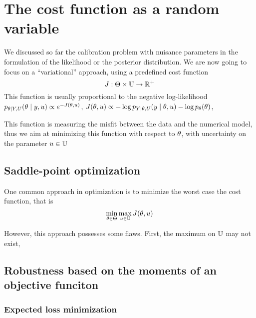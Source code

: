 \documentclass[../../Main_ManuscritThese.tex]{subfiles}
\begin{document}
\section{The cost function as a random variable}
\label{sec:J_rv}
We discussed so far the calibration problem with nuisance parameters in the formulation of the likelihood or the posterior distribution. We are now going to focus on a ``variational'' approach, using a predefined cost function
\begin{equation}
  J: \Theta \times \mathbb{U} \rightarrow \mathbb{R}^+
\end{equation} 
This function is usually proportional to the negative log-likelihood $p_{\theta \mid Y,U}(\theta\mid y,u) \propto e^{-J(\theta,u)}$,  $J(\theta,u) \propto -\log p_{Y \mid \theta,U}(y \mid \theta,u)- \log p_{\theta}(\theta)$,

This function is measuring the misfit between the data and the numerical model, thus we aim at minimizing this function with respect to $\theta$, with uncertainty on the parameter $u \in \mathbb{U}$

\subsection{Saddle-point optimization}
\label{sec:saddle_point}
One common approach in optimization is to minimize the worst case the cost function, that is
\begin{equation}
  \min_{\theta\in\Theta} \max_{u \in \mathbb{U}} J(\theta,u)
\end{equation}

However, this approach possesses some flaws. First, the maximum on $\mathbb{U}$ may not exist, 

\subsection{Robustness based on the moments of an objective funciton}

\subsubsection{Expected loss minimization}
\label{sec:exp_loss_minimization}
\end{document}
